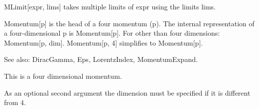 










MLimit[expr, lims] takes multiple limits of expr using the limits lims.






Momentum[p] is the head of a four momentum (p). The internal representation of a four-dimensional p is Momentum[p]. For other than four
  dimensions: Momentum[p, dim]. Momentum[p, 4] simplifies to Momentum[p].

See also:  DiracGamma, Eps, LorentzIndex, MomentumExpand.


This is a four dimensional momentum.



As an optional second argument the dimension must be specified if it is different from 4.


